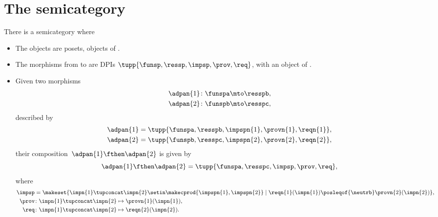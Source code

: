 \section{The semicategory \DPI}
\label{sec:DPI-semicat}


\begin{definition}
    \label{def:DPIcat}
    There is a semicategory \DPI where
    \begin{itemize}
        \item The objects are posets, objects of \PosL.
        \item The morphisms from \funsp to \ressp are DPIs $\tupp{\funsp,\ressp,\impsp,\prov,\req}$, with \impsp an object of \SetL.
        \item Given two morphisms
              \begin{align}
                  \adpan{1} & \colon \funspa \mto \resspb, \\
                  \adpan{2} & \colon \funspb \mto \resspc,
              \end{align}
              described by
              \begin{align}
                  \adpan{1} & = \tupp{\funspa,\resspb,\impspn{1},\provn{1},\reqn{1}}, \\
                  \adpan{2} & = \tupp{\funspb,\resspc,\impspn{2},\provn{2},\reqn{2}},
              \end{align}
              their composition~$\adpan{1} \fthen \adpan{2}$ is given by
              \begin{equation}
                  \adpan{1} \fthen \adpan{2} = \tupp{\funspa,\resspc,\impsp,\prov,\req},
              \end{equation}
              where
              \begin{align}
                  \impsp & = \makeset{ \impn{1} \tupconcat \impn{2} \setin \makecprod{\impspn{1}, \impspn{2}} \mid \reqn{1}(\impn{1}) \posleqof{\neutrb} \provn{2}(\impn{2})}, \\
                  \prov  & \colon \impn{1} \tupconcat \impn{2} \mapsto \provn{1}(\impn{1}), \\
                  \req   & \colon \impn{1} \tupconcat \impn{2} \mapsto \reqn{2}(\impn{2}).
              \end{align}
    \end{itemize}
\end{definition}

